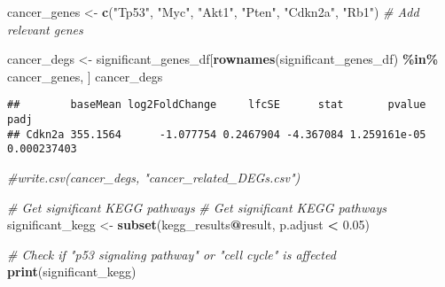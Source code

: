 \documentclass[
]{article}
\newenvironment{Shaded}{\begin{snugshade}}{\end{snugshade}}
\newcommand{\CommentTok}[1]{\textcolor[rgb]{0.56,0.35,0.01}{\textit{#1}}}
\newcommand{\FloatTok}[1]{\textcolor[rgb]{0.00,0.00,0.81}{#1}}
\newcommand{\FunctionTok}[1]{\textcolor[rgb]{0.13,0.29,0.53}{\textbf{#1}}}
\newcommand{\NormalTok}[1]{#1}
\newcommand{\OtherTok}[1]{\textcolor[rgb]{0.56,0.35,0.01}{#1}}
\newcommand{\SpecialCharTok}[1]{\textcolor[rgb]{0.81,0.36,0.00}{\textbf{#1}}}
\newcommand{\StringTok}[1]{\textcolor[rgb]{0.31,0.60,0.02}{#1}}
\begin{document}
\begin{Shaded}
\begin{Highlighting}[]
\NormalTok{cancer\_genes }\OtherTok{\textless{}{-}} \FunctionTok{c}\NormalTok{(}\StringTok{"Tp53"}\NormalTok{, }\StringTok{"Myc"}\NormalTok{, }\StringTok{"Akt1"}\NormalTok{, }\StringTok{"Pten"}\NormalTok{, }\StringTok{"Cdkn2a"}\NormalTok{, }\StringTok{"Rb1"}\NormalTok{)  }\CommentTok{\# Add relevant genes}

\NormalTok{cancer\_degs }\OtherTok{\textless{}{-}}\NormalTok{ significant\_genes\_df[}\FunctionTok{rownames}\NormalTok{(significant\_genes\_df) }\SpecialCharTok{\%in\%}\NormalTok{ cancer\_genes, ]}
\NormalTok{cancer\_degs}
\end{Highlighting}
\end{Shaded}

\begin{verbatim}
##        baseMean log2FoldChange     lfcSE      stat       pvalue        padj
## Cdkn2a 355.1564      -1.077754 0.2467904 -4.367084 1.259161e-05 0.000237403
\end{verbatim}

\begin{Shaded}
\begin{Highlighting}[]
\CommentTok{\#write.csv(cancer\_degs, "cancer\_related\_DEGs.csv")}
\end{Highlighting}
\end{Shaded}

\begin{Shaded}
\begin{Highlighting}[]
\CommentTok{\# Get significant KEGG pathways}
\CommentTok{\# Get significant KEGG pathways}
\NormalTok{significant\_kegg }\OtherTok{\textless{}{-}} \FunctionTok{subset}\NormalTok{(kegg\_results}\SpecialCharTok{@}\NormalTok{result, p.adjust }\SpecialCharTok{\textless{}} \FloatTok{0.05}\NormalTok{)}

\CommentTok{\# Check if "p53 signaling pathway" or "cell cycle" is affected}
\FunctionTok{print}\NormalTok{(significant\_kegg)}
\end{Highlighting}
\end{Shaded}
\end{document}
